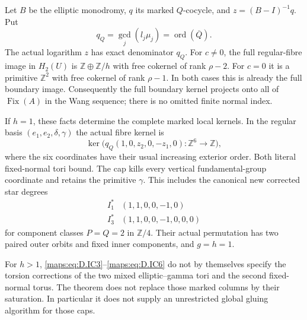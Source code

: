 \begin{theorem}
Let $B$ be the elliptic monodromy, $q$ its marked
$Q$-cocycle, and $z=(B-I)^{-1}q$. Put
\[
        q_Q=\gcd_j(l_j\mu_j)
             =\operatorname{ord}(\overline Q).
                                                        \tag{D.IC6}\label{maps:eq:D.IC6}
\]
The actual logarithm $z$ has exact denominator $q_Q$.
For $c\ne0$, the full regular-fibre image in $H_2(U)$
is $\mathbb Z\oplus\mathbb Z/h$ with free cokernel
of rank $\rho-2$. For $c=0$ it is a primitive
$\mathbb Z^2$ with free cokernel of rank $\rho-1$.
In both cases this is already the full boundary image.
Consequently the full boundary kernel projects onto
all of $\operatorname{Fix}(A)$ in the Wang sequence;
there is no omitted finite normal index.

If $h=1$, these facts determine the complete marked
local kernels. In the regular basis
$(e_1,e_2,\delta,\gamma)$ the actual fibre kernel is
\[
 \ker\bigl(q_Q(1,0,z_2,0,-z_1,0):\mathbb Z^6\to\mathbb Z\bigr),
                                                        \tag{D.IC7}\label{maps:eq:D.IC7}
\]
where the six coordinates have their usual increasing
exterior order. Both literal fixed-normal tori bound.
The cap kills every vertical fundamental-group
coordinate and retains the primitive $\gamma$.
This includes the canonical new corrected star degrees
\[
 \begin{array}{c|c}
 I_1^*&(1,1,0,0,-1,0)\\
 I_3^*&(1,1,0,0,-1,0,0,0)
 \end{array}
                                                        \tag{D.IC8}\label{maps:eq:D.IC8}
\]
for component classes $P=Q=2$ in $\mathbb Z/4$.
Their actual permutation has two paired outer orbits
and fixed inner components, and $g=h=1$.

For $h>1$, \eqref{maps:eq:D.IC3}--\eqref{maps:eq:D.IC6} do not by themselves specify
the torsion corrections of the two mixed
elliptic--gamma tori and the second fixed-normal torus.
The theorem does not replace those marked columns by
their saturation. In particular it does not supply an
unrestricted global gluing algorithm for those caps.

\end{theorem}


